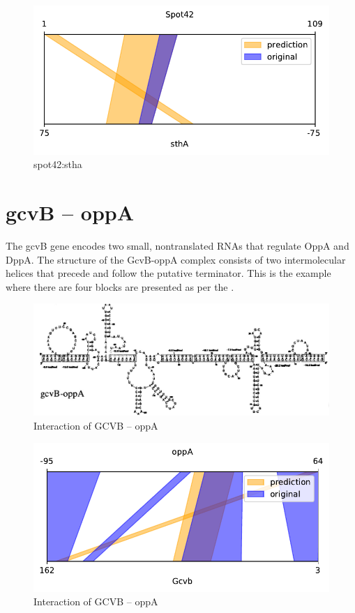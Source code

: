 \documentclass[twoside,a4paper]{report}
\begin{document}
	\begin{figure}[h!tb]
		\centering
		\includegraphics[width=.5\linewidth]{rricomparison2}
		\caption{spot42:stha}
		\label{fig:rricomparison2}
	\end{figure}

\clearpage

	\section{gcvB – oppA }
    The gcvB gene encodes two small, nontranslated RNAs that regulate OppA and DppA. The structure of the GcvB-oppA complex consists of two intermolecular helices that precede and follow the putative terminator. This is the example where there are four blocks are presented as per the {\citep{pervouchine2004iris}} . \\ 
	
		\begin{figure}[h!tb]
		\includegraphics[width=1.0\linewidth]{oppa}
		\centering
		\caption{ Interaction of GCVB – oppA } 
		\label{fig:oppa}
	\end{figure}

	\begin{figure}[h!tb]
	\includegraphics[width=.5\linewidth]{rricomparison6}
	\centering
	\caption{ Interaction of GCVB – oppA } 
	\label{fig:rricomparison6}
\end{figure}
\end{document}
